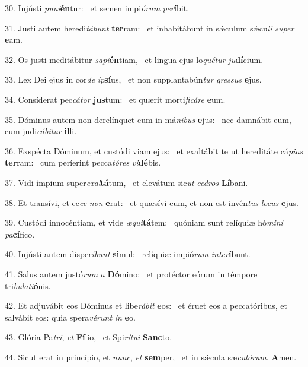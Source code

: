 30. Injústi \textit{pu}\textit{ni}\textbf{én}tur: \ast\  et semen impi\textit{ó}\textit{rum} \textit{per}\textbf{í}bit.\

31. Justi autem heredi\textit{tá}\textit{bunt} \textbf{ter}ram: \ast\  et inhabitábunt in sǽculum sǽcu\textit{li} \textit{su}\textit{per} \textbf{e}am.\

32. Os justi meditábitur \textit{sa}\textit{pi}\textbf{én}tiam, \ast\  et lingua ejus lo\textit{qué}\textit{tur} \textit{ju}\textbf{dí}cium.\

33. Lex Dei ejus in cor\textit{de} \textit{ip}\textbf{sí}us, \ast\  et non supplantabún\textit{tur} \textit{gres}\textit{sus} \textbf{e}jus.\

34. Consíderat pec\textit{cá}\textit{tor} \textbf{jus}tum: \ast\  et quærit morti\textit{fi}\textit{cá}\textit{re} \textbf{e}um.\

35. Dóminus autem non derelínquet eum in má\textit{ni}\textit{bus} \textbf{e}jus: \ast\  nec damnábit eum, cum judi\textit{cá}\textit{bi}\textit{tur} \textbf{il}li.\

36. Exspécta Dóminum, et custódi viam ejus: \dag\  et exaltábit te ut hereditáte cá\textit{pi}\textit{as} \textbf{ter}ram: \ast\  cum períerint pecca\textit{tó}\textit{res} \textit{vi}\textbf{dé}bis.\

37. Vidi ímpium super\textit{ex}\textit{al}\textbf{tá}tum, \ast\  et elevátum sic\textit{ut} \textit{ce}\textit{dros} \textbf{Lí}bani.\

38. Et transívi, et ec\textit{ce} \textit{non} \textbf{e}rat: \ast\  et quæsívi eum, et non est invén\textit{tus} \textit{lo}\textit{cus} \textbf{e}jus.\

39. Custódi innocéntiam, et vide \textit{æ}\textit{qui}\textbf{tá}tem: \ast\  quóniam sunt relíquiæ hó\textit{mi}\textit{ni} \textit{pa}\textbf{cí}fico.\

40. Injústi autem disper\textit{í}\textit{bunt} \textbf{si}mul: \ast\  relíquiæ impió\textit{rum} \textit{in}\textit{ter}\textbf{í}bunt.\

41. Salus autem justó\textit{rum} \textit{a} \textbf{Dó}mino: \ast\  et protéctor eórum in témpore tri\textit{bu}\textit{la}\textit{ti}\textbf{ó}nis.\

42. Et adjuvábit eos Dóminus et libe\textit{rá}\textit{bit} \textbf{e}os: \ast\  et éruet eos a peccatóribus, et salvábit eos: quia spera\textit{vé}\textit{runt} \textit{in} \textbf{e}o.\

43. Glória Pa\textit{tri}, \textit{et} \textbf{Fí}lio, \ast\  et Spi\textit{rí}\textit{tu}\textit{i} \textbf{Sanc}to.\

44. Sicut erat in princípio, et \textit{nunc}, \textit{et} \textbf{sem}per, \ast\  et in sǽcula sæ\textit{cu}\textit{ló}\textit{rum}. \textbf{A}men.\

